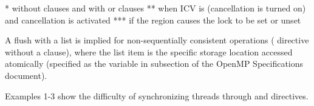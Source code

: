 * without clauses and with  or  clauses \newline
** when  ICV is  (cancellation is turned on) and cancellation is activated \newline
*** if the region causes the lock to be set or unset

A flush with a list is implied for non-sequentially consistent  operations
( directive without a  clause), where the list item is the
specific storage location accessed atomically (specified as the  variable
in  subsection of the OpenMP Specifications document).

Examples 1-3 show the difficulty of synchronizing threads through  and  directives.
